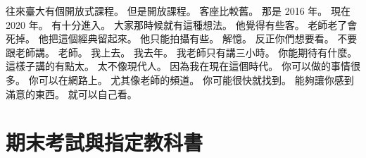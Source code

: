 \hypertarget{c01:cue:1027}{}往來臺大有個開放式課程。
\hypertarget{c01:cue:1028}{}但是開放課程。
\hypertarget{c01:cue:1029}{}客座比較舊。
\hypertarget{c01:cue:1030}{}那是 2016 年。
\hypertarget{c01:cue:1031}{}現在 2020 年。
\hypertarget{c01:cue:1032}{}有十分進入。
\hypertarget{c01:cue:1033}{}大家那時候就有這種想法。
\hypertarget{c01:cue:1034}{}他覺得有些客。
\hypertarget{c01:cue:1035}{}老師老了會死掉。
\hypertarget{c01:cue:1036}{}他把這個經典留起來。
\hypertarget{c01:cue:1037}{}他只能拍攝有些。
\hypertarget{c01:cue:1038}{}解憶。
\hypertarget{c01:cue:1039}{}反正你們想要看。
\hypertarget{c01:cue:1040}{}不要跟老師講。
\hypertarget{c01:cue:1041}{}老師。
\hypertarget{c01:cue:1042}{}我上去。
\hypertarget{c01:cue:1043}{}我去年。
\hypertarget{c01:cue:1044}{}我老師只有講三小時。
\hypertarget{c01:cue:1045}{}你能期待有什麼。
\hypertarget{c01:cue:1046}{}這樣子講的有點太。
\hypertarget{c01:cue:1047}{}太不像現代人。
\hypertarget{c01:cue:1048}{}因為我在現在這個時代。
\hypertarget{c01:cue:1049}{}你可以做的事情很多。
\hypertarget{c01:cue:1050}{}你可以在網路上。
\hypertarget{c01:cue:1051}{}尤其像老師的頻道。
\hypertarget{c01:cue:1052}{}你可能很快就找到。
\hypertarget{c01:cue:1053}{}能夠讓你感到滿意的東西。
\hypertarget{c01:cue:1054}{}就可以自己看。

\section{期末考試與指定教科書}

